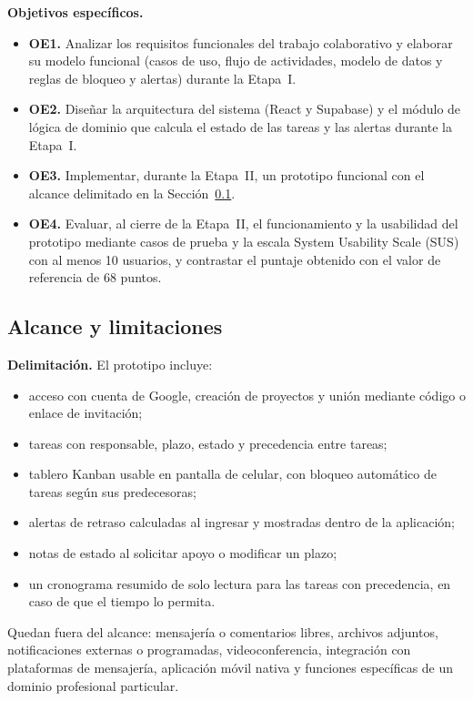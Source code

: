 \documentclass[conference]{IEEEtran}
\begin{document}
\textbf{Objetivos específicos.}
\begin{itemize}
    \item \textbf{OE1.} Analizar los requisitos funcionales del trabajo colaborativo y elaborar su modelo funcional (casos de uso, flujo de actividades, modelo de datos y reglas de bloqueo y alertas) durante la Etapa~I.
    \item \textbf{OE2.} Diseñar la arquitectura del sistema (React y Supabase) y el módulo de lógica de dominio que calcula el estado de las tareas y las alertas durante la Etapa~I.
    \item \textbf{OE3.} Implementar, durante la Etapa~II, un prototipo funcional con el alcance delimitado en la Sección~\ref{sec:alcance}.
    \item \textbf{OE4.} Evaluar, al cierre de la Etapa~II, el funcionamiento y la usabilidad del prototipo mediante casos de prueba y la escala System Usability Scale (SUS) con al menos 10 usuarios, y contrastar el puntaje obtenido con el valor de referencia de 68 puntos.
\end{itemize}

\subsection{Alcance y limitaciones}
\label{sec:alcance}
\textbf{Delimitación.} El prototipo incluye:
\begin{itemize}
    \item acceso con cuenta de Google, creación de proyectos y unión mediante código o enlace de invitación;
    \item tareas con responsable, plazo, estado y precedencia entre tareas;
    \item tablero Kanban usable en pantalla de celular, con bloqueo automático de tareas según sus predecesoras;
    \item alertas de retraso calculadas al ingresar y mostradas dentro de la aplicación;
    \item notas de estado al solicitar apoyo o modificar un plazo;
    \item un cronograma resumido de solo lectura para las tareas con precedencia, en caso de que el tiempo lo permita.
\end{itemize}

Quedan fuera del alcance: mensajería o comentarios libres, archivos adjuntos, notificaciones externas o programadas, videoconferencia, integración con plataformas de mensajería, aplicación móvil nativa y funciones específicas de un dominio profesional particular.
\end{document}
